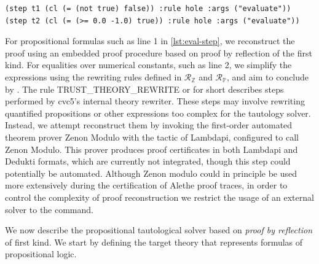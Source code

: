 \smallskip

\begin{lstlisting}[language=SMT,caption={[Proof trace using cvc5 evaluate]An example of proof trace using the cvc5 $\kw{evaluate}$ rule.},label={lst:eval-step}]
(step t1 (cl (= (not true) false)) :rule hole :args ("evaluate"))
(step t2 (cl (= (>= 0.0 -1.0) true)) :rule hole :args ("evaluate"))
\end{lstlisting}

\smallskip

For propositional formulas such as line 1 in \cref{lst:eval-step}, we reconstruct the proof using an embedded proof procedure based on proof by reflection of the first kind.
For equalities over numerical constants, such as line 2, we simplify the expressions using the rewriting rules defined in $\mathcal{R}_{\mathbb{Z}}$ and $\mathcal{R}_{\mathbb{P}}$, and aim to conclude by .
The rule TRUST\_THEORY\_REWRITE or  for short describes steps performed by cvc5’s internal theory rewriter.
These steps may involve rewriting quantified propositions or other expressions too complex for the tautology solver.
Instead, we attempt reconstruct them by invoking the first-order automated theorem prover Zenon Modulo \cite{zenonmodulo} with the tactic  of Lambdapi, configured to call Zenon Modulo.
This prover produces proof certificates in both Lambdapi and Dedukti formats, which are currently not integrated,  though this step could potentially be automated.
Although Zenon modulo could in principle be used more extensively during the certification of Alethe proof traces, in order to control the complexity of proof reconstruction we restrict the usage of an external solver to the  command.

We now describe the propositional tautological solver based on \emph{proof by reflection} of first kind.
We start by defining the target theory that represents formulas of propositional logic.

